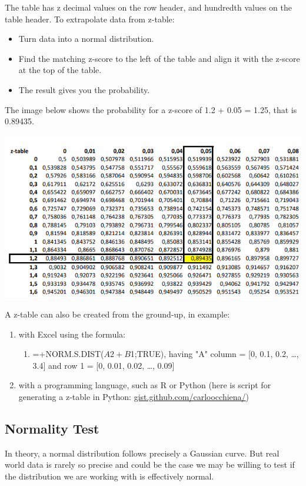 \documentclass{article}
\begin{document}
The table has z decimal values on the row header, and hundredth values on the table header. 
To extrapolate data from z-table:
\begin{itemize}
    \item Turn data into a normal distribution.
    \item Find the matching z-score to the left of the table and align it with the z-score at the top of the table.
    \item The result gives you the probability. 
\end{itemize}

The image below shows the probability for a z-score of 1.2 + 0.05 = 1.25, that is 0.89435.

\includegraphics{z-table}

A z-table can also be created from the ground-up, in example: 
\begin{enumerate}
    \item with Excel using the formula:
    \begin{enumerate}
        \item =+NORM.S.DIST($A2+B$1;TRUE), having "A" column = [0, 0.1, 0.2, …, 3.4] and row 1 = [0, 0.01, 0.02, …, 0.09]
    \end{enumerate}
    \item with a programming language, such as R or Python (here is script for generating a z-table in Python: \href{https://gist.github.com/carloocchiena/f65e1381a30004352561a606ee0ba51a}{gist.github.com/carloocchiena/})
\end{enumerate}

\subsection{Normality Test}
In theory, a normal distribution follows precisely a Gaussian curve. But real world data is rarely so precise and could be the case we may be willing to test if the distribution we are working with is effectively normal.
\end{document}
